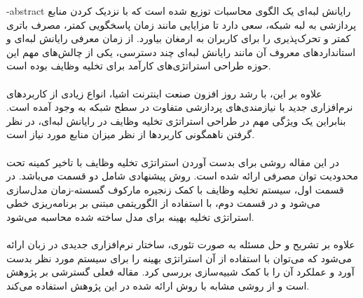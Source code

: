 \esalatPage
\mojavezPage

 \newpage

% 
% 
% 
% 
% 
% 
\fa-abstract{
رایانش لبه‌ای یک الگوی محاسبات توزیع شده است که با نزدیک کردن منابع پردازشی به لبه شبکه، سعی دارد تا مزایایی مانند زمان پاسخگویی کمتر، مصرف باتری کمتر و تحرک‌پذیری را برای کاربران به ارمغان بیاورد. از زمان معرفی رایانش لبه‌ای و استانداردهای معروف آن مانند رایانش لبه‌ای چند دسترسی، یکی از چالش‌های مهم این حوزه طراحی استراتژی‌های کارآمد برای تخلیه وظایف بوده است. \\ \\ علاوه بر این، با رشد روز افزون صنعت اینترنت اشیا، انواع زیادی از کاربردهای نرم‌افزاری جدید با نیازمندی‌های پردازشی متفاوت در سطح شبکه به وجود آمده است. بنابراین یک ویژگی مهم در طراحی استراتژی تخلیه وظایف در رایانش لبه‌ای، در نظر گرفتن ناهمگونی کاربردها از نظر میزان منابع مورد نیاز است. \\ \\ در این مقاله روشی برای بدست آوردن استراتژی تخلیه وظایف با تاخیر کمینه تحت محدودیت توان مصرفی ارائه شده است. روش پیشنهادی شامل دو قسمت می‌باشد. در قسمت اول، سیستم تخلیه وظایف با کمک زنجیره مارکوف گسسته-زمان مدل‌سازی می‌شود و در قسمت دوم، با استفاده از الگوریتمی مبتنی بر برنامه‌ریزی خطی استراتژی تخلیه بهینه برای مدل ساخته شده محاسبه می‌شود. \\ \\ علاوه بر تشریح و حل مسئله به صورت تئوری، ساختار نرم‌افزاری جدیدی در زبان  ارائه می‌شود که می‌توان با استفاده از آن استراتژی بهینه را برای سیستم مورد نظر بدست آورد و عملکرد آن را با کمک شبیه‌سازی بررسی کرد. مقاله فعلی گسترشی بر پژوهش \cite{Liu} است و از روشی مشابه با روش ارائه شده در این پژوهش استفاده می‌کند.
}

\abstractPage

\newpage\clearpage